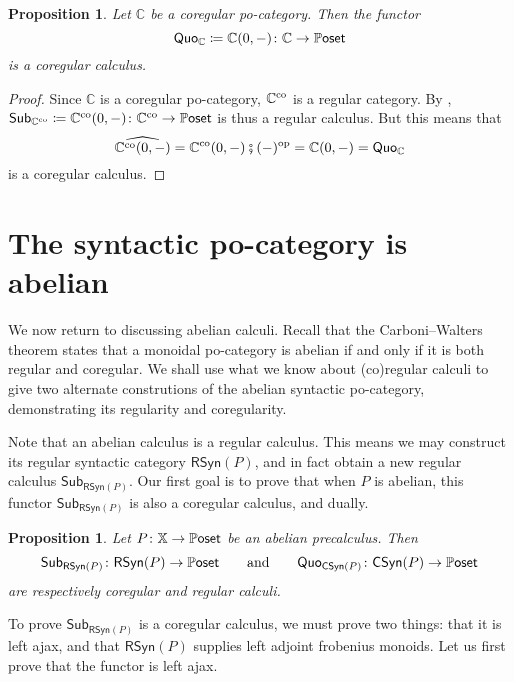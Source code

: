 \documentclass[11pt, oneside, article]{memoir}
\theoremstyle{plain}
\newtheorem{proposition}[theorem]{Proposition}
\theoremstyle{definition}
\theoremstyle{remark}
\newcommand{\Cat}[1]{{\mathsf{#1}}}%
\newcommand{\CCat}[1]{\mathbb{\StrLeft{#1}{1}}\Cat{\StrGobbleLeft{#1}{1}}}%
\newcommand{\Funr}[1]{\mathsf{#1}}%
\newcommand{\tn}[1]{\textnormal{#1}}
\newcommand{\op}{^{\tn{op}}}
\newcommand{\co}{^{\tn{co}}}
\newcommand{\cc}{\mathbb{C}}
\newcommand{\xx}{\mathbb{X}}
\newcommand{\sub}{\Funr{Sub}}
\newcommand{\quo}{\Funr{Quo}}
\newcommand{\rsyn}{\Funr{RSyn}}
\newcommand{\csyn}{\Funr{CSyn}}
\newcommand{\abc}{P} %
\newcommand{\cp}{\mathbin{\fatsemi}}
\newcommand{\pposet}{\CCat{Poset}}
\begin{document}
\begin{proposition}
  Let $\cc$ be a coregular po-category. Then the functor 
  \[
    \quo_\cc \coloneqq \cc(0,-)\colon \cc \to \pposet
  \]
  is a coregular calculus.
\end{proposition}
\begin{proof}
  Since $\cc$ is a coregular po-category, $\cc\co$ is a regular category. By \cite[Theorem~3.16]{fong2018graphical}, $\sub_{\cc\co}\coloneqq \cc\co(0,-)\colon \cc\co \to \pposet$ is thus a regular calculus. But this means that 
  \[
    \widehat{\cc\co(0,-)} = \cc\co(0,-)\cp (-)\op = \cc(0,-) = \quo_\cc
  \] 
  is a coregular calculus.
\end{proof}



\section{The syntactic po-category is abelian} \label{sec.abelian_proof}

We now return to discussing abelian calculi. Recall that the Carboni--Walters theorem states that a monoidal po-category is abelian if and only if it is both regular and coregular. We shall use what we know about (co)regular calculi to give two alternate construtions of the abelian syntactic po-category, demonstrating its regularity and coregularity.

Note that an abelian calculus is a regular calculus. This means we may construct its regular syntactic category $\rsyn(\abc)$, and in fact obtain a new regular calculus $\sub_{\rsyn(\abc)}$. Our first goal is to prove that when $\abc$ is abelian, this functor $\sub_{\rsyn(\abc)}$ is also a coregular calculus, and dually. 

\begin{proposition}\label{prop.newcalc}
  Let $\abc\colon \xx \to \pposet$ be an abelian precalculus. Then
  \[
    \sub_{\rsyn(\abc)} \colon \rsyn(\abc) \to \pposet 
    \qquad \mbox{and} \qquad
    \quo_{\csyn(\abc)} \colon \csyn(\abc) \to \pposet
  \]
  are respectively coregular and regular calculi.
\end{proposition}

To prove $\sub_{\rsyn(\abc)}$ is a coregular calculus, we must prove two things: that it is left ajax, and that $\rsyn(\abc)$ supplies left adjoint frobenius monoids. Let us first prove that the functor is left ajax.
\end{document}

